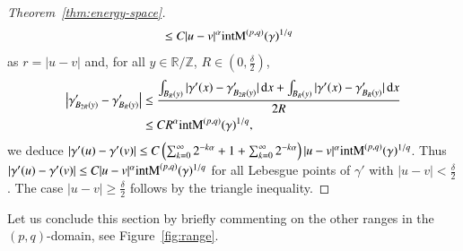 \begin{proof}[Theorem~\ref{thm:energy-space}]
\begin{align*}
    &\leq C |u-v|^\alpha \mathrm{intM}^{(p,q)}(\gamma)^{1/q} 
  \end{align*}
  as $r=|u-v|$ and, for all $y \in \mathbb R / \mathbb Z$, $R\in(0,\tfrac\delta2)$,
  \begin{align*}
   \left| {\gamma}'_{B_{2R}(y)} - {\gamma}'_{B_{R}(y)} \right| 
   &\leq \frac {\int_{B_{R}(y)} |{\gamma}'(x) - {\gamma}'_{B_{2R}(y)}| \,\mathrm{d} x +
    \int_{B_{R}(y)} |{\gamma}'(x) - {\gamma}'_{B_{R}(y)}| \,\mathrm{d} x} {2R}
    \\
    &\leq C R^\alpha \mathrm{intM}^{(p,q)}(\gamma)^{1/q},
  \end{align*}
  we deduce
   $|{\gamma}'(u) - {\gamma}'(v)| 
   \leq C \left( \sum_{k=0} ^\infty 2^{-k\alpha} + 1 +  \sum_{k=0} ^\infty 2^{-k\alpha}   \right)
   |u-v|^\alpha \mathrm{intM}^{(p,q)}(\gamma)^{1/q}$.
  Thus
   $|{\gamma}'(u) - {\gamma}'(v)| \leq C |u-v|^\alpha \mathrm{intM}^{(p,q)}(\gamma)^{1/q}$
 for all Lebesgue points of $\gamma'$ with $|u-v| < \frac\delta2$.
 The case $|u-v| \geq \frac\delta2$ follows by the triangle inequality.
\end{proof}

Let us conclude this section by briefly commenting on the other
ranges in the $(p,q)$-domain, see Figure~\ref{fig:range}.

